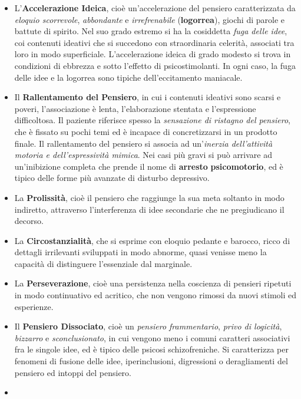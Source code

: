 \begin{itemize}
\item
  L'\textbf{Accelerazione Ideica}, cioè un'accelerazione del pensiero
  caratterizzata da \emph{eloquio scorrevole}, \emph{abbondante} e
  \emph{irrefrenabile} (\textbf{logorrea}), giochi di parole e battute
  di spirito. Nel suo grado estremo si ha la cosiddetta \emph{fuga delle
  idee}, coi contenuti ideativi che si succedono con straordinaria
  celerità, associati tra loro in modo superficiale. L'accelerazione
  ideica di grado modesto si trova in condizioni di ebbrezza e sotto
  l'effetto di psicostimolanti. In ogni caso, la fuga delle idee e la
  logorrea sono tipiche dell'eccitamento maniacale.
\item
  Il \textbf{Rallentamento del Pensiero}, in cui i contenuti ideativi
  sono scarsi e poveri, l'associazione è lenta, l'elaborazione stentata
  e l'espressione difficoltosa. Il paziente riferisce spesso la
  \emph{sensazione di ristagno del pensiero}, che è fissato su pochi
  temi ed è incapace di concretizzarsi in un prodotto finale. Il
  rallentamento del pensiero si associa ad un'\emph{inerzia
  dell'attività motoria e dell'espressività mimica}. Nei casi più gravi
  si può arrivare ad un'inibizione completa che prende il nome di
  \textbf{arresto} \textbf{psicomotorio}, ed è tipico delle forme più
  avanzate di disturbo depressivo.
\item
  La \textbf{Prolissità}, cioè il pensiero che raggiunge la sua meta
  soltanto in modo indiretto, attraverso l'interferenza di idee
  secondarie che ne pregiudicano il decorso.
\item
  La \textbf{Circostanzialità}, che si esprime con eloquio pedante e
  barocco, ricco di dettagli irrilevanti sviluppati in modo abnorme,
  quasi venisse meno la capacità di distinguere l'essenziale dal
  marginale.
\item
  La \textbf{Perseverazione}, cioè una persistenza nella coscienza di
  pensieri ripetuti in modo continuativo ed acritico, che non vengono
  rimossi da nuovi stimoli ed esperienze.
\item
  Il \textbf{Pensiero Dissociato}, cioè un \emph{pensiero frammentario},
  \emph{privo di logicità}, \emph{bizzarro} e \emph{sconclusionato}, in
  cui vengono meno i comuni caratteri associativi fra le singole idee,
  ed è tipico delle psicosi schizofreniche. Si caratterizza per fenomeni
  di fusione delle idee, iperinclusioni, digressioni o deragliamenti del
  pensiero ed intoppi del pensiero.
\item

\end{itemize}
